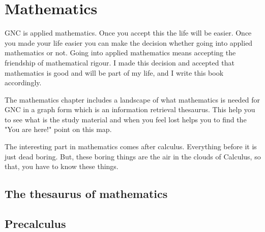 \part{Mathematics}

GNC is applied mathematics. Once you accept this the life will be easier. Once
you made your life easier you can make the decision whether going into applied
mathematics or not. Going into applied mathematics means accepting the
friendship of mathematical rigour. I made this decision and accepted that
mathematics is good and will be part of my life, and I write this book
accordingly.

The mathematics chapter includes a landscape of what mathematics is needed for
GNC in a graph form which is an information retrieval thesaurus. This help you
to see what is the study material and when you feel lost helps you to find the
"You are here!" point on this map.

The interesting part in mathematics comes after calculus. Everything before it
is just dead boring. But, these boring things are the air in the clouds of
Calculus, so that, you have to know these things.

\chapter{The thesaurus of mathematics}


\chapter{Precalculus}


